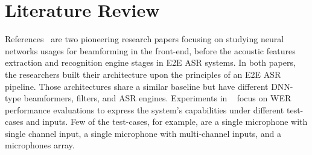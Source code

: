 \bigskip



\section{Literature Review}
References~\cite{7472778, 7952160} are 
two pioneering research papers focusing on 
studying neural networks usages
for beamforming in the front-end,
before the acoustic features extraction and
recognition engine stages in E2E ASR systems.
In both papers, the researchers built their architecture
upon the principles of an E2E ASR pipeline.
Those architectures share a similar baseline but have different
DNN-type beamformers, filters, and ASR engines.
Experiments in ~\cite{7472778, 7952160}
focus on WER performance evaluations to express
the system's capabilities under 
different test-cases and inputs.
Few of the test-cases, for example, are a single microphone 
with single channel input,
a single microphone with multi-channel inputs,
and a microphones array.

